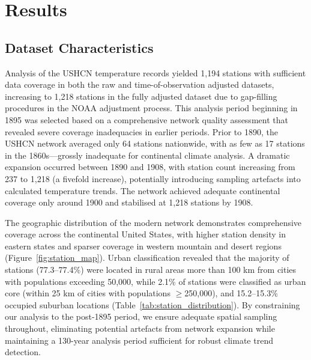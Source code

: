 \documentclass[11pt, a4paper]{article}
\begin{document}
\section{Results}
\subsection{Dataset Characteristics}

Analysis of the USHCN temperature records yielded 1,194 stations with sufficient data coverage in both the raw and time-of-observation adjusted datasets, increasing to 1,218 stations in the fully adjusted dataset due to gap-filling procedures in the NOAA adjustment process. This analysis period beginning in 1895 was selected based on a comprehensive network quality assessment that revealed severe coverage inadequacies in earlier periods. Prior to 1890, the USHCN network averaged only 64 stations nationwide, with as few as 17 stations in the 1860s—grossly inadequate for continental climate analysis. A dramatic expansion occurred between 1890 and 1908, with station count increasing from 237 to 1,218 (a fivefold increase), potentially introducing sampling artefacts into calculated temperature trends. The network achieved adequate continental coverage only around 1900 and stabilised at 1,218 stations by 1908.

The geographic distribution of the modern network demonstrates comprehensive coverage across the continental United States, with higher station density in eastern states and sparser coverage in western mountain and desert regions (Figure~\ref{fig:station_map}). Urban classification revealed that the majority of stations (77.3--77.4\%) were located in rural areas more than 100 km from cities with populations exceeding 50,000, while 2.1\% of stations were classified as urban core (within 25 km of cities with populations $\geq$250,000), and 15.2--15.3\% occupied suburban locations (Table~\ref{tab:station_distribution}). By constraining our analysis to the post-1895 period, we ensure adequate spatial sampling throughout, eliminating potential artefacts from network expansion while maintaining a 130-year analysis period sufficient for robust climate trend detection.
\end{document}
